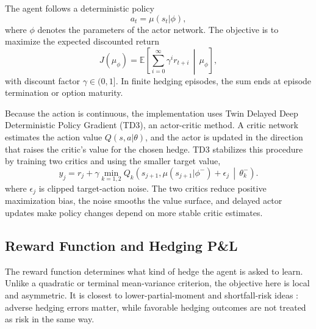 \documentclass[a4paper,12pt]{article}
\numberwithin{equation}{section}
\begin{document}
The agent follows a deterministic policy
\begin{equation}
    a_t = \mu(s_t|\phi),
\end{equation}
where $\phi$ denotes the parameters of the actor network. The objective is to maximize the expected discounted return
\begin{equation}
    J(\mu_\phi)
    =
    \mathbb{E}
    \left[
        \sum_{i=0}^{\infty}\gamma^i r_{t+i}
        \,\middle|\, \mu_\phi
    \right],
    \label{eq:rl_objective}
\end{equation}
with discount factor $\gamma \in (0,1]$. In finite hedging episodes, the sum ends at episode termination or option maturity.

Because the action is continuous, the implementation uses Twin Delayed Deep Deterministic Policy Gradient (TD3), an actor-critic method. A critic network estimates the action value $Q(s,a|\theta)$, and the actor is updated in the direction that raises the critic's value for the chosen hedge. TD3 stabilizes this procedure by training two critics and using the smaller target value,
\begin{equation}
    y_j
    =
    r_j
    +
    \gamma
    \min_{k=1,2}
    Q_k
    \left(
        s_{j+1},
        \mu(s_{j+1}|\phi^-)+\epsilon_j
        \,\middle|\,
        \theta_k^-
    \right).
    \label{eq:td3_target}
\end{equation}
where $\epsilon_j$ is clipped target-action noise. The two critics reduce positive maximization bias, the noise smooths the value surface, and delayed actor updates make policy changes depend on more stable critic estimates.

\subsection{Reward Function and Hedging P\&L}

The reward function determines what kind of hedge the agent is asked to learn. Unlike a quadratic or terminal mean-variance criterion, the objective here is local and asymmetric. It is closest to lower-partial-moment and shortfall-risk ideas \citep{follmer2000efficient,schulmerich2003local,coleman2003discrete}: adverse hedging errors matter, while favorable hedging outcomes are not treated as risk in the same way.
\end{document}
